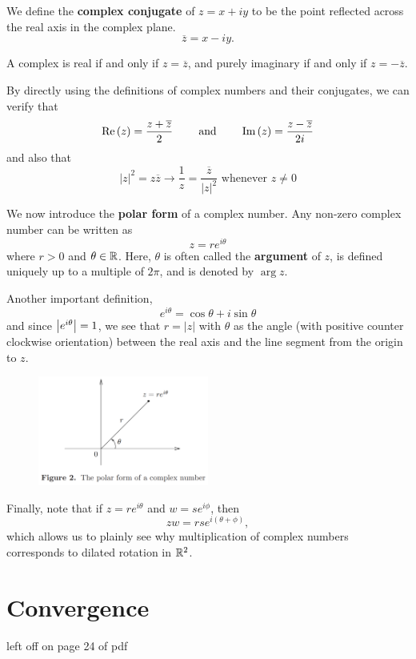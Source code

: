 \documentclass{exam}
\begin{document}
We define the \textbf{complex conjugate} of $z = x + iy$ to be the point reflected across the real
axis in the complex plane.
$$\overline{z} = x - iy.$$

A complex is real if and only if $z = \overline{z}$, and purely imaginary if and only if
$z = -\overline{z}$. 

By directly using the definitions of complex numbers and their conjugates, we can verify that
$$\text{Re}\left( z \right) = \frac{z + \overline{z}}{2}\qquad \text{ and } \qquad \text{Im}\left( z \right) = \frac{z - \overline{z}}{2i}$$
and also that
$$|z|^2 = z\overline{z} \longrightarrow \frac{1}{z} = \frac{\overline{z}}{|z|^2} \text{ whenever } z \neq 0$$

\newpage

We now introduce the \textbf{polar form} of a complex number. Any non-zero complex number can be written as
$$z = re^{i\theta}$$
where $r > 0$ and $\theta \in \mathbb {R}$. Here, $\theta$ is often called the \textbf{argument} of $z$, is
defined uniquely up to a multiple of $2\pi$, and is denoted by $\arg{z}$.

Another important definition,
$$e^{i\theta} = \cos{\theta} + i\sin{\theta}$$
and since $\left| e^{i\theta} \right| = 1$, we see that $r = |z|$ with $\theta$ as the angle (with positive
counter clockwise orientation) between the real axis and the line segment from the origin to $z$.

\begin{figure}[H]
    \centering
    \includegraphics[width=0.5\textwidth]{figures/complex_analysis/figure_2.png}
\end{figure}

Finally, note that if $z = re^{i\theta}$ and $w = se^{i\phi}$, then
$$zw = rse^{i(\theta + \phi)},$$
which allows us to plainly see why multiplication of complex numbers corresponds to
dilated rotation in $\mathbb {R}^2$.

\section{Convergence}
left off on page 24 of pdf
\end{document}
